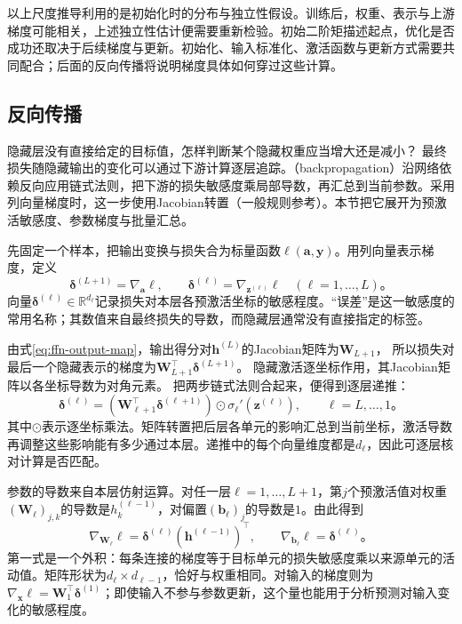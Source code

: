 以上尺度推导利用的是初始化时的分布与独立性假设。训练后，权重、表示与上游梯度可能相关，上述独立性估计便需要重新检验。初始二阶矩描述起点，优化是否成功还取决于后续梯度与更新。初始化、输入标准化、激活函数与更新方式需要共同配合；后面的反向传播将说明梯度具体如何穿过这些计算。

\subsection{反向传播}
\label{sec:ffn-backpropagation}

隐藏层没有直接给定的目标值，怎样判断某个隐藏权重应当增大还是减小？
最终损失随隐藏输出的变化可以通过下游计算逐层追踪。（backpropagation）沿网络依赖反向应用链式法则，把下游的损失敏感度乘局部导数，再汇总到当前参数。采用列向量梯度时，这一步使用Jacobian转置（一般规则参考）。本节把它展开为预激活敏感度、参数梯度与批量汇总。

先固定一个样本，把输出变换与损失合为标量函数$\ell(\bm{a},\bm{y})$。用列向量表示梯度，定义
\begin{equation}
  \bm{\delta}^{(L+1)}=\nabla_{\bm{a}}\ell,
  \qquad
  \bm{\delta}^{(\ell)}=\nabla_{\bm{z}^{(\ell)}}\ell
  \quad(\ell=1,\ldots,L)\text{。}
  \label{eq:ffn-delta-definition}
\end{equation}
向量$\bm{\delta}^{(\ell)}\in\mathbb{R}^{d_\ell}$记录损失对本层各预激活坐标的敏感程度。“误差”是这一敏感度的常用名称；其数值来自最终损失的导数，而隐藏层通常没有直接指定的标签。

由式\eqref{eq:ffn-output-map}，输出得分对$\bm{h}^{(L)}$的Jacobian矩阵为$\bm{W}_{L+1}$，
所以损失对最后一个隐藏表示的梯度为$\bm{W}_{L+1}^{\top}\bm{\delta}^{(L+1)}$。
隐藏激活逐坐标作用，其Jacobian矩阵以各坐标导数为对角元素。
把两步链式法则合起来，便得到逐层递推：
\begin{equation}
  \bm{\delta}^{(\ell)}=
  \left(\bm{W}_{\ell+1}^{\top}\bm{\delta}^{(\ell+1)}\right)
  \odot\sigma_\ell'\!\left(\bm{z}^{(\ell)}\right),
  \qquad \ell=L,\ldots,1\text{。}
  \label{eq:ffn-backward-recursion}
\end{equation}
其中$\odot$表示逐坐标乘法。矩阵转置把后层各单元的影响汇总到当前坐标，激活导数再调整这些影响能有多少通过本层。递推中的每个向量维度都是$d_\ell$，因此可逐层核对计算是否匹配。

参数的导数来自本层仿射运算。对任一层$\ell=1,\ldots,L+1$，第$j$个预激活值对权重$(\bm{W}_\ell)_{j,k}$的导数是$h_k^{(\ell-1)}$，对偏置$(\bm{b}_\ell)_j$的导数是$1$。由此得到
\begin{equation}
  \nabla_{\bm{W}_\ell}\ell
    =\bm{\delta}^{(\ell)}(\bm{h}^{(\ell-1)})^{\top},
  \qquad
  \nabla_{\bm{b}_\ell}\ell=\bm{\delta}^{(\ell)}\text{。}
  \label{eq:ffn-parameter-gradients}
\end{equation}
第一式是一个外积：每条连接的梯度等于目标单元的损失敏感度乘以来源单元的活动值。矩阵形状为$d_\ell\times d_{\ell-1}$，恰好与权重相同。对输入的梯度则为$\nabla_{\bm{x}}\ell=\bm{W}_1^{\top}\bm{\delta}^{(1)}$；即使输入不参与参数更新，这个量也能用于分析预测对输入变化的敏感程度。

